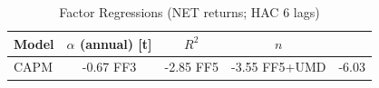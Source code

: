 \begin{table}[!ht]
\centering
\caption{Factor Regressions (NET returns; HAC 6 lags)}
\label{tab:ff_regressions}
\begin{tabular}{lccc}
\toprule
Model & $\alpha$ (annual) [t] & $R^2$ & $n$ \\
\midrule
CAPM & -0.67%
FF3 & -2.85%
FF5 & -3.55%
FF5+UMD & -6.03%
\bottomrule
\end{tabular}
\end{table}
